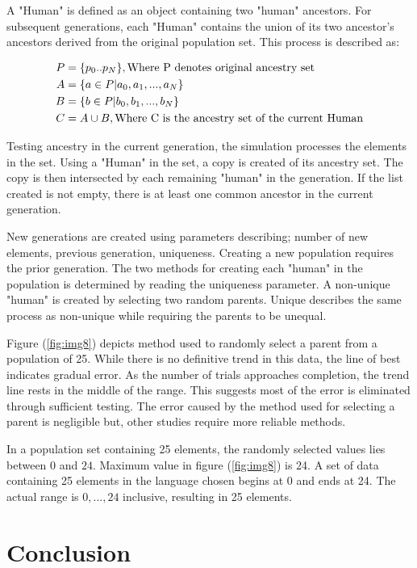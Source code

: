 \documentclass[12pt]{extarticle}
\begin{document}
A "Human" is defined as an object containing two "human" ancestors. For subsequent generations, each "Human" contains the union of its two ancestor's ancestors derived from the original population set. This process is described as:

\begin{align}
\notag
P &= \{p_0..p_N\}, \text{Where P denotes original ancestry set} \\
\notag
A &= \{a\in P | a_0,a_1, ..., a_N\} \\
\notag
B &= \{b\in P| b_0,b_1, ..., b_N\} \\
\notag
C &= A \cup B, \text{Where C is the ancestry set of the current Human} \\
\end{align}

Testing ancestry in the current generation, the simulation processes the elements in the set. Using a "Human" in the set, a copy is created of its ancestry set. The copy is then intersected by each remaining "human" in the generation. If the list created is not empty, there is at least one common ancestor in the current generation.

New generations are created using parameters describing; number of new elements, previous generation, uniqueness. Creating a new population requires the prior generation. The two methods for creating each "human" in the population is determined by reading the uniqueness parameter. A non-unique "human" is created by selecting two random parents. Unique describes the same process as non-unique while requiring the parents to be unequal.

Figure (\ref{fig:img8}) depicts method used to randomly select a parent from a population of 25. While there is no definitive trend in this data, the line of best indicates gradual error. As the number of trials approaches completion, the trend line rests in the middle of the range. This suggests most of the error is eliminated through sufficient testing. The error caused by the method used for selecting a parent is negligible but, other studies require more reliable methods. 

In a population set containing 25 elements, the randomly selected values lies between $0$ and $24$. Maximum value in figure (\ref{fig:img8}) is 24. A set of data containing 25 elements in the language chosen begins at 0 and ends at 24. The actual range is $0, ..., 24$ inclusive, resulting in 25 elements.

\section{Conclusion}
\end{document}
